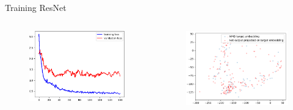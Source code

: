 \documentclass{beamer}
\begin{document}
\begin{frame}{Training ResNet}
  \begin{columns}
    \begin{column}[t]{.48\textwidth}
      \begin{figure}[ht]
        \centering
        \includegraphics[width=1.0\textwidth,height=0.7\textheight]{figures/train_resnet.png}
        \caption*{\label{fig:train-resnet}}
      \end{figure}
    \end{column}
    \begin{column}[t]{.48\textwidth}
      \begin{figure}[ht]
        \centering
        \includegraphics[width=1.0\textwidth,height=0.7\textheight]{figures/emb_resnet.png}
        \caption*{\label{fig:resnet-emb}}
      \end{figure}
    \end{column}
  \end{columns}
\end{frame}
\end{document}
